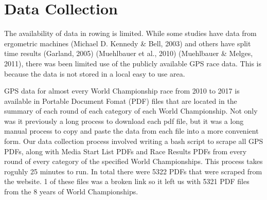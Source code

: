 \documentclass[11pt,]{article}
\begin{document}
\section{Data Collection}\label{data-collection}

The availability of data in rowing is limited. While some studies have
data from ergometric machines (Michael D. Kennedy \& Bell, 2003) and
others have split time results (Garland, 2005) (Muehlbauer et al., 2010)
(Muehlbauer \& Melges, 2011), there was been limited use of the publicly
available GPS race data. This is because the data is not stored in a
local easy to use area.

GPS data for almost every World Championship race from 2010 to 2017 is
available in Portable Document Fomat (PDF) files that are located in the
summary of each round of each category of each World Championship. Not
only was it previously a long process to download each pdf file, but it
was a long manual process to copy and paste the data from each file into
a more convenient form. Our data collection process involved writing a
bash script to scrape all GPS PDFs, along with Media Start List PDFs and
Race Results PDFs from every round of every category of the specified
World Championships. This process takes roguhly 25 minutes to run. In
total there were 5322 PDFs that were scraped from the website. 1 of
these files was a broken link so it left us with 5321 PDF files from the
8 years of World Championships.
\end{document}
